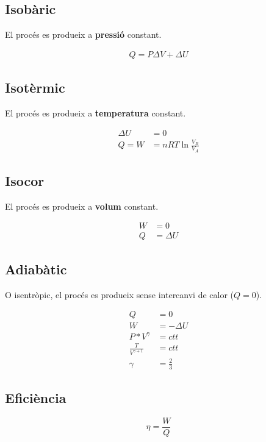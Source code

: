 \subsection{Isobàric}
\label{sub:isobaric}
El procés es produeix a \textbf{pressió} constant.

\begin{align}
    Q = P \Delta V + \Delta U
\end{align}

\subsection{Isotèrmic}
\label{sub:isotermic}
El procés es produeix a \textbf{temperatura} constant.

\begin{align}
    \Delta U &= 0\\
    Q = W &= nRT\ln\frac{V_B}{V_A}
\end{align}

\subsection{Isocor}
\label{sub:isocor}
El procés es produeix a \textbf{volum} constant.

\begin{align}
    W &= 0\\
    Q &= \Delta U
\end{align}

\pagebreak

\subsection{Adiabàtic}
\label{sub:adiabatic}
O isentròpic, el procés es produeix sense intercanvi de calor ($Q=0$).

\begin{align}
    Q &= 0\nonumber\\
    W &= -\Delta U \\
    P*V^\gamma &= ctt \\
    \frac{T}{V^{\gamma + 1}} &= ctt \\
    \gamma &= \frac{2}{3} \nonumber
\end{align}

\subsection{Eficiència}
\label{sub:eficiencia}

\begin{equation}
    \eta = \frac{W}{Q}
\end{equation}


